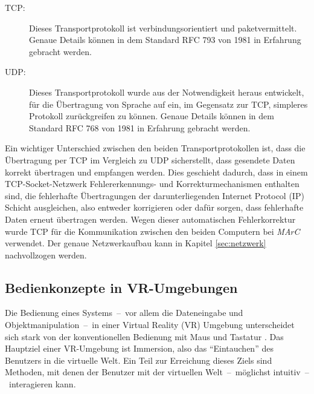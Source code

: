 \begin{description}
\item[TCP:] Dieses Transportprotokoll ist verbindungsorientiert und paketvermittelt. Genaue Details können in dem Standard RFC 793 \citep{rfc793} von 1981 in Erfahrung gebracht werden.

\item[UDP:] Dieses Transportprotokoll wurde aus der Notwendigkeit heraus entwickelt, für die Übertragung von Sprache auf ein, im Gegensatz zur TCP, simpleres Protokoll zurückgreifen zu können. Genaue Details können in dem Standard RFC 768 \citep{rfc768} von 1981 in Erfahrung gebracht werden.
\end{description}

Ein wichtiger Unterschied zwischen den beiden Transportprotokollen ist, dass die Übertragung per TCP im Vergleich zu UDP sicherstellt, dass gesendete Daten korrekt übertragen und empfangen werden. Dies geschieht dadurch, dass in einem TCP-Socket-Netzwerk Fehlererkennungs- und Korrekturmechanismen enthalten sind, die fehlerhafte Übertragungen der darunterliegenden Internet Protocol (IP) Schicht ausgleichen, also entweder korrigieren oder dafür sorgen, dass fehlerhafte Daten erneut übertragen werden. Wegen dieser automatischen Fehlerkorrektur wurde TCP für die Kommunikation zwischen den beiden Computern bei \textit{MArC} verwendet. Der genaue Netzwerkaufbau kann in Kapitel \ref{sec:netzwerk} nachvollzogen werden.

\subsection{Bedienkonzepte in VR-Umgebungen}\label{sec:MenüAnwendungen}
Die Bedienung eines Systems~--~vor allem die Dateneingabe und Objektmanipulation~--~in einer Virtual Reality (VR) Umgebung unterscheidet sich stark von der konventionellen Bedienung mit Maus und Tastatur \cite{chu1997multi}. Das Hauptziel einer VR-Umgebung ist Immersion, also das "`Eintauchen"' des Benutzers in die virtuelle Welt. Ein Teil zur Erreichung dieses Ziels sind Methoden, mit denen der Benutzer mit der virtuellen Welt~--~möglichst intuitiv~--~interagieren kann.

